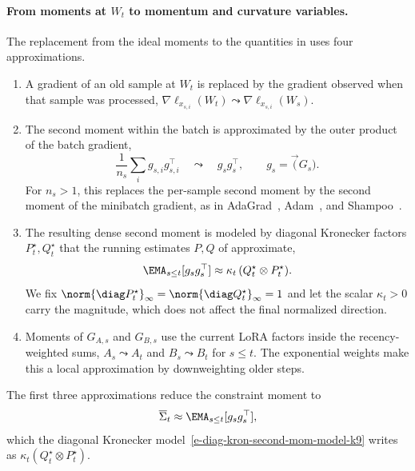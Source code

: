 \paragraph{From moments at $W_t$ to momentum and curvature variables.}
The replacement from the ideal moments to the quantities in
 uses four approximations.
\begin{enumerate}[leftmargin=1.6em,itemsep=2pt,topsep=2pt]
  \item A gradient of an old sample at $W_t$ is replaced by the gradient
  observed when that sample was processed,
  $\nabla\ell_{x_{s,i}}(W_t)\leadsto\nabla\ell_{x_{s,i}}(W_s)$.
  \item The second moment within the batch is approximated by the outer
  product of the batch gradient,
  \[
    \frac1{n_s}\sum_i g_{s,i}g_{s,i}^\top
    \quad\leadsto\quad
    g_sg_s^\top,
    \qquad g_s=\vec(G_s).
  \]
  For $n_s>1$, this replaces the per-sample second moment by the
  second moment of the minibatch gradient, as in AdaGrad~\cite{adagrad},
  Adam~\cite{adam}, and Shampoo~\cite{shampoo}.
  \item The resulting dense second moment is modeled by diagonal
  Kronecker factors $P^\star_t,Q^\star_t$ that the running estimates $P,Q$
  of  approximate,
  \begin{equation}\label{e-diag-kron-second-mom-model-k9}
    \EMA_{s\le t}[g_sg_s^\top]\approx\kappa_t\,(Q^\star_t\otimes P^\star_t).
  \end{equation}
  We fix $\norm{\diag P^\star_t}_\infty=\norm{\diag Q^\star_t}_\infty=1$ and
  let the scalar $\kappa_t>0$ carry the magnitude, which does not affect the
  final normalized direction.
  \item Moments of $G_{A,s}$ and $G_{B,s}$ use the current LoRA factors inside the
  recency-weighted sums,
  $A_s\leadsto A_t$ and $B_s\leadsto B_t$ for $s\le t$. The exponential
  weights make this a local approximation by downweighting older steps.
\end{enumerate}
The first three approximations reduce the constraint moment to
\[
  \overline\Sigma_t\approx\EMA_{s\le t}[g_sg_s^\top],
\]
which the diagonal Kronecker model~\eqref{e-diag-kron-second-mom-model-k9}
writes as $\kappa_t(Q^\star_t\otimes P^\star_t)$.

